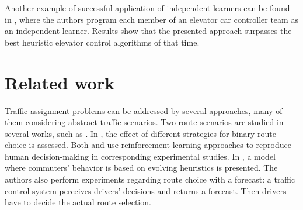 \documentclass{RITA}
\begin{document}
Another example of successful application of independent learners can be found in \cite{Crites&Barto1998}, where the authors program each member of an elevator car controller team as an independent learner. Results show that the presented approach surpasses the best heuristic elevator control algorithms of that time.




\section{Related work}
\label{sec:related}




Traffic assignment problems can be addressed by several approaches, many of them considering abstract traffic scenarios. Two-route scenarios are studied in several works, such as \cite{Bazzan+2000icmas,Ben-Elia&Shiftan2010,Chmura&Pitz2007,Kluegl&Bazzan2004jasss}. In \cite{Bazzan+2000icmas}, the effect of different strategies for binary route choice is assessed. %
Both \cite{Ben-Elia&Shiftan2010} and \cite{Chmura&Pitz2007} use reinforcement learning approaches to reproduce human decision-making in corresponding experimental studies. %
In \cite{Kluegl&Bazzan2004jasss}, a model where commuters' behavior is based on evolving heuristics is presented. The authors also perform experiments regarding route choice with a forecast: a traffic control system perceives drivers' decisions and returns a forecast. Then drivers have to decide the actual route selection. %
\end{document}
